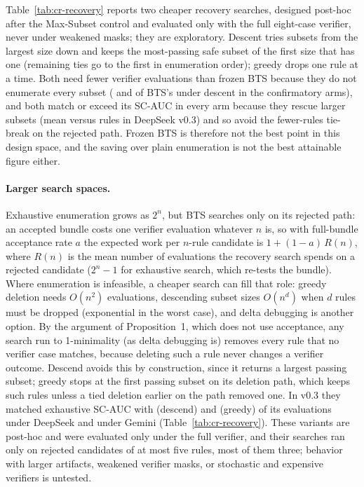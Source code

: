 \documentclass{article}
\begin{document}
Table~\ref{tab:cr-recovery} reports two cheaper recovery searches, designed post-hoc after the Max-Subset control and evaluated only with the full eight-case verifier, never under weakened masks; they are exploratory. Descent tries subsets from the largest size down and keeps the most-passing safe subset of the first size that has one (remaining ties go to the first in enumeration order); greedy drops one rule at a time. Both need fewer verifier evaluations than frozen BTS because they do not enumerate every subset (\CRRecovDSConfDescendEvalShare{} and \CRRecovGemConfDescendEvalShare{} of BTS's under descent in the confirmatory arms), and both match or exceed its SC-AUC in every arm because they rescue larger subsets (mean \CRRecovDSConfDescendMeanRules{} versus \CRRecovDSConfExhaustiveMeanRules{} rules in DeepSeek v0.3) and so avoid the fewer-rules tie-break on the rejected path. Frozen BTS is therefore not the best point in this design space, and the \CRWorkDSConfReduction{} saving over plain enumeration is not the best attainable figure either.

\paragraph{Larger search spaces.} Exhaustive enumeration grows as $2^n$, but BTS searches only on its rejected path: an accepted bundle costs one verifier evaluation whatever $n$ is, so with full-bundle acceptance rate $a$ the expected work per $n$-rule candidate is $1+(1-a)\,R(n)$, where $R(n)$ is the mean number of evaluations the recovery search spends on a rejected candidate ($2^n-1$ for exhaustive search, which re-tests the bundle). Where enumeration is infeasible, a cheaper search can fill that role: greedy deletion needs $O(n^2)$ evaluations, descending subset sizes $O(n^d)$ when $d$ rules must be dropped (exponential in the worst case), and delta debugging is another option. By the argument of Proposition~1, which does not use acceptance, any search run to 1-minimality (as delta debugging is) removes every rule that no verifier case matches, because deleting such a rule never changes a verifier outcome. Descend avoids this by construction, since it returns a largest passing subset; greedy stops at the first passing subset on its deletion path, which keeps such rules unless a tied deletion earlier on the path removed one. In v0.3 they matched exhaustive SC-AUC with \CRRecovDSConfDescendEvalShare{} (descend) and \CRRecovDSConfGreedyEvalShare{} (greedy) of its evaluations under DeepSeek and \CRRecovGemConfDescendEvalShare{} under Gemini (Table~\ref{tab:cr-recovery}). These variants are post-hoc and were evaluated only under the full verifier, and their searches ran only on rejected candidates of at most five rules, most of them three; behavior with larger artifacts, weakened verifier masks, or stochastic and expensive verifiers is untested.
\end{document}
